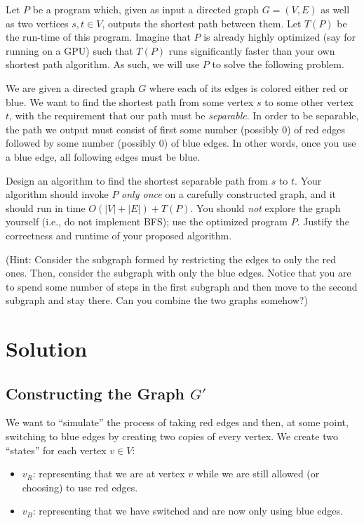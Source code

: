\documentclass[11pt]{article}
\begin{document}
    \begin{tcolorbox}[title={Problem 2 (Shortest Separable Path, 35 pts)}] \setlength\parindent{1em}
        Let $P$ be a program which, given as input a directed graph $G = (V, E)$ as well as two vertices $s, t \in V$, outputs the shortest path between them. Let $T(P)$ be the run-time of this program. Imagine that $P$ is already highly optimized (say for running on a GPU) such that $T(P)$ runs significantly faster than your own shortest path algorithm. As such, we will use $P$ to solve the following problem.
        
        We are given a directed graph $G$ where each of its edges is colored either red or blue. We want to find the shortest path from some vertex $s$ to some other vertex $t$, with the requirement that our path must be \emph{separable}. In order to be separable, the path we output must consist of first some number (possibly 0) of red edges followed by some number (possibly 0) of blue edges. In other words, once you use a blue edge, all following edges must be blue.

        Design an algorithm to find the shortest separable path from $s$ to $t$. Your algorithm should invoke $P$ \emph{only once} on a carefully constructed graph, and it should run in time $O(|V | + |E|) + T(P)$. You should \emph{not} explore the graph yourself (i.e., do not implement BFS); use the optimized program $P$. Justify the correctness and runtime of your proposed algorithm.
        
        (Hint: Consider the subgraph formed by restricting the edges to only the red ones. Then, consider the subgraph with only the blue edges. Notice that you are to spend some number of steps in the first subgraph and then move to the second subgraph and stay there. Can you combine the two graphs somehow?)
    \end{tcolorbox}

    \section*{Solution}

    \subsection*{Constructing the Graph \(G'\)}
    We want to “simulate” the process of taking red edges and then, at some point, switching to blue edges by creating two copies of every vertex. We create two “states” for each vertex \(v\in V\):
    \begin{itemize}
      \item \(v_R\): representing that we are at vertex \(v\) while we are still allowed (or choosing) to use red edges.
      \item \(v_B\): representing that we have switched and are now only using blue edges.
    \end{itemize}
    
\end{document}
